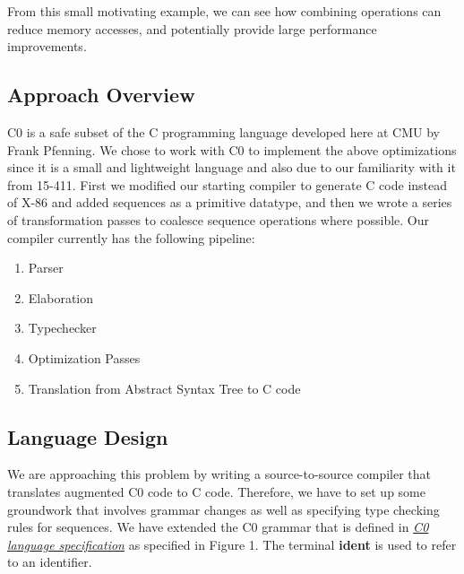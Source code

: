 \documentclass[a4paper,twocolumn]{article}
\begin{document}
\noindent
From this small motivating example, we can see how combining operations can
reduce memory accesses, and potentially provide large performance improvements.

\subsection{Approach Overview}
C0 is a safe subset of the C programming language developed here at CMU by
Frank Pfenning. We chose to work with C0 to implement the above optimizations
since it is a small and lightweight language and also due to our familiarity with it
from 15-411. First we modified our starting compiler to generate C code instead
of X-86 and added sequences as a primitive datatype, and then we wrote a series
of transformation passes to coalesce sequence operations where possible. Our
compiler currently has the following pipeline:
\begin{enumerate}
  \item Parser
  \item Elaboration
  \item Typechecker
  \item Optimization Passes
  \item Translation from Abstract Syntax Tree to C code
\end{enumerate}
\setlength{\grammarparsep}{5pt plus 1pt minus 1pt} %
\setlength{\grammarindent}{10em} %

\subsection{Language Design}

\newcommand{\nonterm}[1]{$\langle${#1}$\rangle$}
\newcommand{\OR}{\ensuremath{\ | \ \ }}
\newcommand{\term}[1]{\textbf{#1}}
\newcommand{\code}[1]{\texttt{#1}}

We are approaching this problem by writing a source-to-source compiler that
translates augmented C0 code to C code. Therefore, we have to set up some
groundwork that involves grammar changes as well as specifying type checking
rules for sequences. We have extended the C0 grammar that is defined in
\href{http://c0.typesafety.net/doc/c0-reference.pdf}{\textit{C0 language
    specification}} as specified in Figure 1.
The terminal \term{ident} is used to refer to an identifier.
\end{document}
